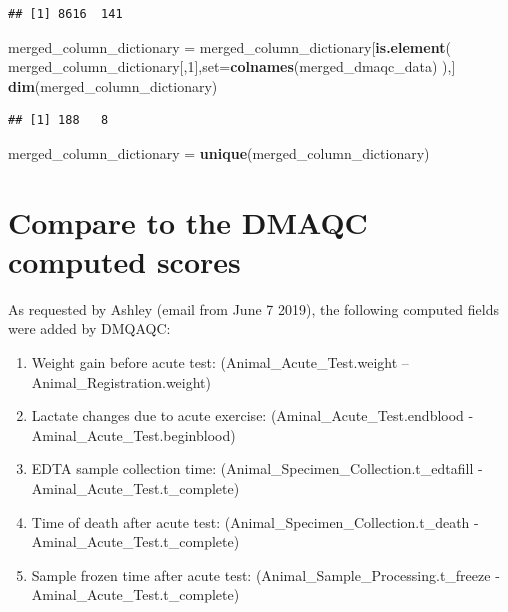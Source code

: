 \documentclass[]{article}
\newenvironment{Shaded}{\begin{snugshade}}{\end{snugshade}}
\newcommand{\KeywordTok}[1]{\textcolor[rgb]{0.13,0.29,0.53}{\textbf{#1}}}
\newcommand{\DataTypeTok}[1]{\textcolor[rgb]{0.13,0.29,0.53}{#1}}
\newcommand{\DecValTok}[1]{\textcolor[rgb]{0.00,0.00,0.81}{#1}}
\newcommand{\StringTok}[1]{\textcolor[rgb]{0.31,0.60,0.02}{#1}}
\newcommand{\NormalTok}[1]{#1}
\providecommand{\tightlist}{%
  \setlength{\itemsep}{0pt}\setlength{\parskip}{0pt}}
\begin{document}
\begin{verbatim}
## [1] 8616  141
\end{verbatim}

\begin{Shaded}
\begin{Highlighting}[]
\NormalTok{merged_column_dictionary =}\StringTok{ }\NormalTok{merged_column_dictionary[}\KeywordTok{is.element}\NormalTok{(}
\NormalTok{  merged_column_dictionary[,}\DecValTok{1}\NormalTok{],}\DataTypeTok{set=}\KeywordTok{colnames}\NormalTok{(merged_dmaqc_data)}
\NormalTok{  ),]}
\KeywordTok{dim}\NormalTok{(merged_column_dictionary)}
\end{Highlighting}
\end{Shaded}

\begin{verbatim}
## [1] 188   8
\end{verbatim}

\begin{Shaded}
\begin{Highlighting}[]
\NormalTok{merged_column_dictionary =}\StringTok{ }\KeywordTok{unique}\NormalTok{(merged_column_dictionary)}
\end{Highlighting}
\end{Shaded}

\section{Compare to the DMAQC computed
scores}\label{compare-to-the-dmaqc-computed-scores}

As requested by Ashley (email from June 7 2019), the following computed
fields were added by DMQAQC:

\begin{enumerate}
\def\labelenumi{\arabic{enumi}.}
\tightlist
\item
  Weight gain before acute test: (Animal\_Acute\_Test.weight --
  Animal\_Registration.weight)
\item
  Lactate changes due to acute exercise: (Aminal\_Acute\_Test.endblood -
  Aminal\_Acute\_Test.beginblood)
\item
  EDTA sample collection time: (Animal\_Specimen\_Collection.t\_edtafill
  - Aminal\_Acute\_Test.t\_complete)
\item
  Time of death after acute test: (Animal\_Specimen\_Collection.t\_death
  - Aminal\_Acute\_Test.t\_complete)
\item
  Sample frozen time after acute test:
  (Animal\_Sample\_Processing.t\_freeze -
  Aminal\_Acute\_Test.t\_complete)
\end{enumerate}
\end{document}
